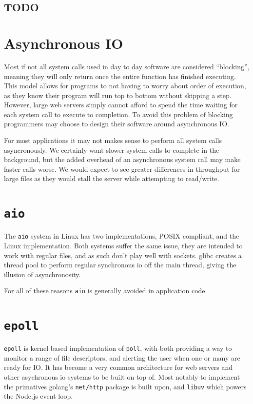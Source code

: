 \documentclass[letterpaper, 10pt, twocolumn]{article}
\begin{document}
\subsection{TODO}
\label{sec:org19aebf8}

\section{Asynchronous IO}
\label{sec:orga1ef17b}
Most if not all system calls used in day to day software are considered ``blocking'', meaning they will only return once the entire function has finished executing. This model allows for programs to not having to worry about order of execution, as they know their program will run top to bottom without skipping a step. However, large web servers simply cannot afford to spend the time waiting for each system call to execute to completion. To avoid this problem of blocking programmers may choose to design their software around asynchronous IO.

For most applications it may not makes sense to perform all system calls asyncronously. We certainly want slower system calls to complete in the background, but the added overhead of an asynchronous system call may make faster calls worse. We would expect to see greater differences in throughput for large files as they would stall the server while attempting to read/write.

\section{\texttt{aio}}
\label{sec:org8f9a11b}
The \texttt{aio} system in Linux has two implementations, POSIX compliant, and the Linux implementation. Both systems suffer the same issue, they are intended to work with regular files, and as such don't play well with sockets. glibc creates a thread pool to perform regular synchronous io off the main thread, giving the illusion of asynchronosity.

For all of these reasons \texttt{aio} is generally avoided in application code.

\section{\texttt{epoll}}
\label{sec:orgbb51c36}
\texttt{epoll} is kernel based implementation of \texttt{poll}, with both providing a way to monitor a range of file descriptors, and alerting the user when one or many are ready for IO. It has become a very common architecture for web servers and other asychronous io systems to be built on top of. Most notably to implement the primatives golang's \texttt{net/http} package is built upon, and \texttt{libuv} which powers the Node.js event loop.
\end{document}
